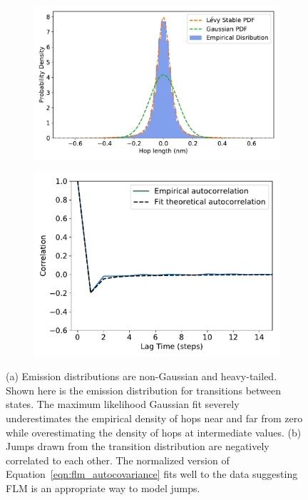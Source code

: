 \documentclass{article}
\begin{document}
  \begin{figure}
  \centering
  \begin{subfigure}{0.49\textwidth}
  \includegraphics[width=\textwidth]{gaussian_levy_comparison.pdf}
  \caption{}\label{fig:gaussian_levy_comparison}
  \end{subfigure}
  \begin{subfigure}{0.42\textwidth}
  \includegraphics[width=\textwidth]{msddm_acf.pdf}
  \caption{}\label{fig:msddm_acf}
  \end{subfigure}
  \caption{(a) Emission distributions are non-Gaussian and heavy-tailed. Shown here is the
  emission distribution for transitions between states. The maximum likelihood
  Gaussian fit severely underestimates the empirical density of hops near and far from zero 
  while overestimating the density of hops at intermediate values. (b) Jumps drawn from
  the transition distribution are negatively correlated to each other. The normalized version 
  of Equation~\ref{eqn:flm_autocovariance} fits well to the data suggesting FLM is
  an appropriate way to model jumps.} \label{fig:msddm_emissions}
  \end{figure}
  
\end{document}
